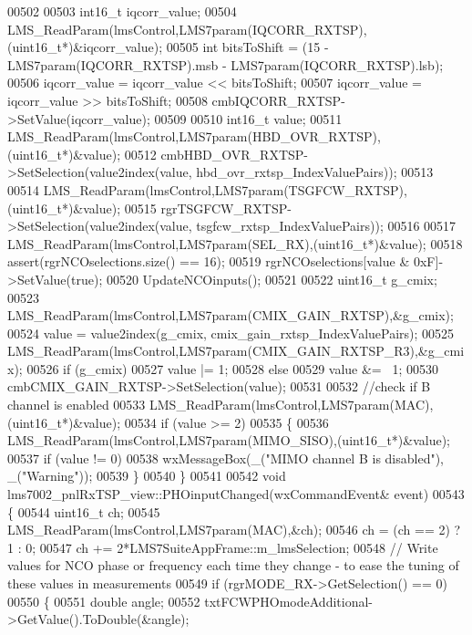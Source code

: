 \begin{DoxyCode}
{{{{{{{{{{{{{{{{{{00502 
00503     int16\_t iqcorr\_value;
00504     LMS_ReadParam(lmsControl,LMS7param(IQCORR_RXTSP),(uint16\_t*)&iqcorr\_value);
00505     \textcolor{keywordtype}{int} bitsToShift = (15 - LMS7param(IQCORR_RXTSP).msb - LMS7param(IQCORR_RXTSP).lsb);
00506     iqcorr\_value = iqcorr\_value << bitsToShift;
00507     iqcorr\_value = iqcorr\_value >> bitsToShift;
00508     cmbIQCORR_RXTSP->SetValue(iqcorr\_value);
00509 
00510     int16\_t value;
00511     LMS_ReadParam(lmsControl,LMS7param(HBD_OVR_RXTSP),(uint16\_t*)&value);
00512     cmbHBD_OVR_RXTSP->SetSelection(value2index(value, 
      hbd_ovr_rxtsp_IndexValuePairs));
00513 
00514     LMS_ReadParam(lmsControl,LMS7param(TSGFCW_RXTSP),(uint16\_t*)&value);
00515     rgrTSGFCW_RXTSP->SetSelection(value2index(value, 
      tsgfcw_rxtsp_IndexValuePairs));
00516 
00517     LMS_ReadParam(lmsControl,LMS7param(SEL_RX),(uint16\_t*)&value);
00518     assert(rgrNCOselections.size() == 16);
00519     rgrNCOselections[value & 0xF]->SetValue(\textcolor{keyword}{true});
00520     UpdateNCOinputs();
00521 
00522     uint16\_t g\_cmix;
00523     LMS_ReadParam(lmsControl,LMS7param(CMIX_GAIN_RXTSP),&g\_cmix);
00524     value = value2index(g\_cmix, cmix_gain_rxtsp_IndexValuePairs);
00525     LMS_ReadParam(lmsControl,LMS7param(CMIX_GAIN_RXTSP_R3),&g\_cmix);
00526     \textcolor{keywordflow}{if} (g\_cmix)
00527         value |= 1;
00528     \textcolor{keywordflow}{else}
00529         value &= ~1;
00530     cmbCMIX_GAIN_RXTSP->SetSelection(value);
00531 
00532     \textcolor{comment}{//check if B channel is enabled}
00533     LMS_ReadParam(lmsControl,LMS7param(MAC),(uint16\_t*)&value);
00534     \textcolor{keywordflow}{if} (value >= 2)
00535     \{
00536         LMS_ReadParam(lmsControl,LMS7param(MIMO_SISO),(uint16\_t*)&value);
00537         \textcolor{keywordflow}{if} (value != 0)
00538             wxMessageBox(\_(\textcolor{stringliteral}{"MIMO channel B is disabled"}), \_(\textcolor{stringliteral}{"Warning"}));
00539     \}
00540 \}
00541 
00542 \textcolor{keywordtype}{void} lms7002_pnlRxTSP_view::PHOinputChanged(wxCommandEvent& event)
00543 \{
00544     uint16\_t ch;
00545     LMS_ReadParam(lmsControl,LMS7param(MAC),&ch);
00546     ch = (ch == 2) ? 1 : 0;
00547     ch += 2*LMS7SuiteAppFrame::m_lmsSelection;
00548     \textcolor{comment}{// Write values for NCO phase or frequency each time they change - to ease the tuning of these values
       in measurements}
00549     \textcolor{keywordflow}{if} (rgrMODE_RX->GetSelection() == 0)
00550     \{
00551         \textcolor{keywordtype}{double} angle;
00552         txtFCWPHOmodeAdditional->GetValue().ToDouble(&angle);
}}}}}}}}}}}}}}}}}}
\end{DoxyCode}
